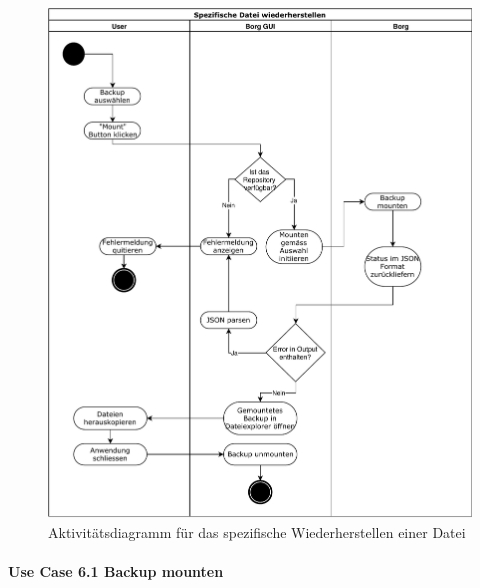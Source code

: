 \begin{figure}[htbp]
\centering
\includegraphics[width=.9\linewidth]{pictures/activity_mount.pdf}
\caption{\label{fig:orgbcf997e}
Aktivitätsdiagramm für das spezifische Wiederherstellen einer Datei}
\end{figure}

\newpage
\paragraph{Use Case 6.1 Backup mounten}
\label{sec:org0eb4e4f}

